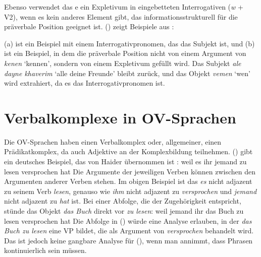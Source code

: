 \noindent
Ebenso verwendet das e ein Expletivum in eingebetteten Interrogativen (\emph{w} + V2), wenn
es kein anderes Element gibt, das informationsstrukturell für die präverbale Position geeignet ist.
() zeigt Beispiele aus \citet[--404]{Prince89a}:

\eal
{}
\zl
(a) ist ein Beispiel mit einem Interrogativpronomen, das das Subjekt ist, und (b) ist ein
Beispiel, in dem die präverbale Position nicht von einem Argument von \emph{kenen} `kennen', sondern von
einem Expletivum gefüllt wird. Das Subjekt \emph{ale dayne khaverim} `alle deine Freunde' bleibt zurück, und das Objekt
\emph{vemen} `wen' wird extrahiert, da es das Interrogativpronomen ist.

\section{Verbalkomplexe in OV-Sprachen}

Die   OV-Sprachen haben einen Verbalkomplex oder, allgemeiner, einen Prädikatkomplex, da auch Adjektive
an der Komplexbildung teilnehmen. () gibt ein deutsches Beispiel, das von Haider übernommen ist \parencites*[]{Haider86c}[]{Haider90b}:
\ea
weil es ihr jemand zu lesen versprochen hat
\z
Die Argumente der jeweiligen Verben können zwischen den Argumenten anderer Verben stehen. Im obigen Beispiel
ist das \emph{es} nicht adjazent zu seinem Verb \emph{lesen}, genauso wie \emph{ihm}
nicht adjazent zu \emph{versprochen} und \emph{jemand} nicht adjazent zu \emph{hat} ist. Bei einer
Abfolge, die der Zugehörigkeit entspricht, stünde das Objekt \emph{das Buch} direkt vor \emph{zu lesen}:
\ea
weil jemand ihr das Buch zu lesen versprochen hat
\z
Die Abfolge in () würde eine Analyse erlauben, in der \emph{das Buch zu lesen} eine VP bildet,
die als Argument von \emph{versprochen} behandelt wird. Das ist jedoch keine gangbare
Analyse für (), wenn man annimmt, dass Phrasen kontinuierlich sein müssen.

